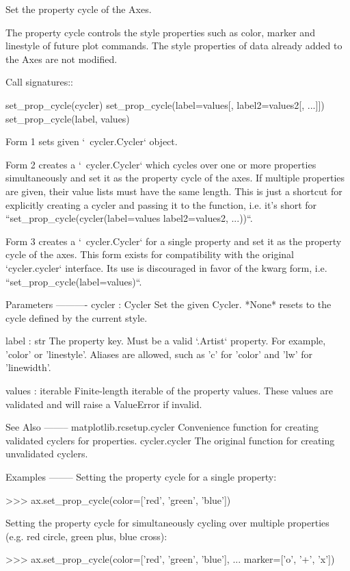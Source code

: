 \begin{DoxyVerb}Set the property cycle of the Axes.

The property cycle controls the style properties such as color,
marker and linestyle of future plot commands. The style properties
of data already added to the Axes are not modified.

Call signatures::

  set_prop_cycle(cycler)
  set_prop_cycle(label=values[, label2=values2[, ...]])
  set_prop_cycle(label, values)

Form 1 sets given `~cycler.Cycler` object.

Form 2 creates a `~cycler.Cycler` which cycles over one or more
properties simultaneously and set it as the property cycle of the
axes. If multiple properties are given, their value lists must have
the same length. This is just a shortcut for explicitly creating a
cycler and passing it to the function, i.e. it's short for
``set_prop_cycle(cycler(label=values label2=values2, ...))``.

Form 3 creates a `~cycler.Cycler` for a single property and set it
as the property cycle of the axes. This form exists for compatibility
with the original `cycler.cycler` interface. Its use is discouraged
in favor of the kwarg form, i.e. ``set_prop_cycle(label=values)``.

Parameters
----------
cycler : Cycler
    Set the given Cycler. *None* resets to the cycle defined by the
    current style.

label : str
    The property key. Must be a valid `.Artist` property.
    For example, 'color' or 'linestyle'. Aliases are allowed,
    such as 'c' for 'color' and 'lw' for 'linewidth'.

values : iterable
    Finite-length iterable of the property values. These values
    are validated and will raise a ValueError if invalid.

See Also
--------
matplotlib.rcsetup.cycler
    Convenience function for creating validated cyclers for properties.
cycler.cycler
    The original function for creating unvalidated cyclers.

Examples
--------
Setting the property cycle for a single property:

>>> ax.set_prop_cycle(color=['red', 'green', 'blue'])

Setting the property cycle for simultaneously cycling over multiple
properties (e.g. red circle, green plus, blue cross):

>>> ax.set_prop_cycle(color=['red', 'green', 'blue'],
...                   marker=['o', '+', 'x'])\end{DoxyVerb}
 \mbox{\label{classmatplotlib_1_1axes_1_1__base_1_1__AxesBase_a1a0ceec4b53b6125740dfb076ec7f5af}} 
